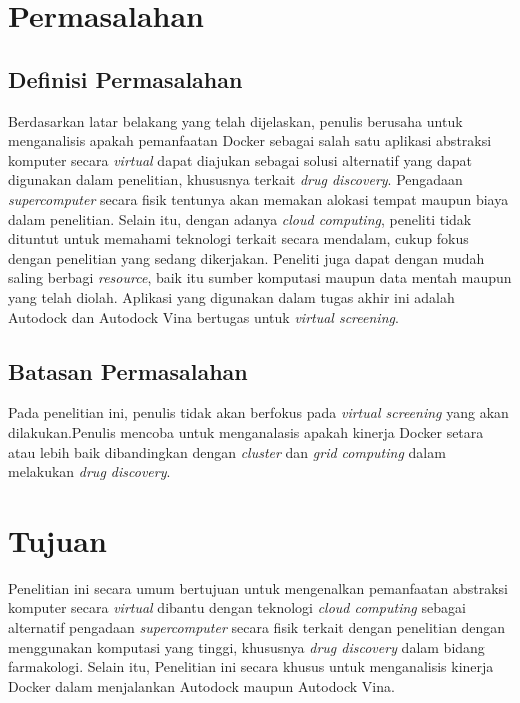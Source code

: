 \section{Permasalahan}
\subsection{Definisi Permasalahan}
Berdasarkan latar belakang yang telah dijelaskan, penulis berusaha untuk menganalisis
apakah pemanfaatan Docker sebagai salah satu aplikasi abstraksi komputer secara \textit{virtual} dapat diajukan sebagai solusi alternatif
yang dapat digunakan dalam penelitian, khususnya terkait \textit{drug discovery}. 
Pengadaan \textit{supercomputer} secara fisik tentunya akan memakan alokasi tempat maupun biaya dalam penelitian.
Selain itu, dengan adanya \textit{cloud computing}, peneliti tidak dituntut untuk memahami
teknologi terkait secara mendalam, cukup fokus dengan penelitian yang sedang dikerjakan. Peneliti juga dapat dengan mudah saling berbagi \textit{resource}, baik itu sumber komputasi maupun data mentah maupun yang telah diolah.  
Aplikasi yang digunakan dalam tugas akhir ini adalah Autodock dan Autodock Vina bertugas untuk \textit{virtual screening}.


\subsection{Batasan Permasalahan}
Pada penelitian ini, penulis tidak akan berfokus pada \textit{virtual screening} yang akan dilakukan.Penulis mencoba untuk menganalasis apakah kinerja Docker setara atau lebih baik dibandingkan dengan \textit{cluster} dan 
\textit{grid computing} dalam melakukan \textit{drug discovery}. 


\section{Tujuan}
Penelitian ini secara umum bertujuan untuk mengenalkan pemanfaatan abstraksi komputer secara \textit{virtual} dibantu dengan teknologi \textit{cloud computing}
sebagai alternatif pengadaan \textit{supercomputer} secara fisik terkait dengan penelitian dengan menggunakan komputasi yang tinggi, khususnya \textit{drug discovery}
dalam bidang farmakologi. Selain itu, Penelitian ini secara khusus untuk menganalisis kinerja Docker
dalam menjalankan Autodock maupun Autodock Vina.


